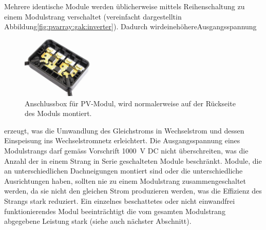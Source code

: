 Mehrere  identische  Module  werden  \"ublicherweise  mittels  Reihenschaltung
zu  einem  Modulstrang  verschaltet  (vereinfacht  dargestellt\hfill  in\hfill
Abbildung\hfill    \ref{fig:pvarray:gak:inverter}).    \hfill    Dadurch\hfill
wird\hfill eine\hfill h\"ohere\hfill Ausgangsspannung

\begin{figure}
    \centering
    \includegraphics[width=0.3\textwidth]{images/solar-facility/pvJunctionBox.jpeg}
    \caption[Anschlussbox PV-Modul]{
        Anschlussbox f\"ur  PV-Modul, wird  normalerweise auf  der R\"uckseite
        des Moduls montiert. \cite{ref:junctionBox}%
    }
    \label{fig:pvJunctionBox}
\end{figure}

\noindent erzeugt,  was die  Umwandlung des  Gleichstroms in  Wechselstrom und
dessen  Einspeisung  ins  Wechselstromnetz  erleichtert. Die  Ausgangsspannung
eines  Modulstrangs   darf  gem\"ass  Vorschrift  \SI{1000}{\volt}   DC  nicht
\"uberschreiten,  was die  Anzahl der  in einem  Strang in  Serie geschalteten
Module beschr\"ankt.  Module, die  an unterschiedlichen Dachneigungen montiert
sind  oder die  unterschiedliche  Ausrichtungen haben,  sollten  nie zu  einem
Modulstrang  zusammengeschaltet  werden,  da  sie  nicht  den  gleichen  Strom
produzieren  werden,  was  die  Effizienz  des  Strangs  stark  reduziert. Ein
einzelnes   beschattetes  oder   nicht   einwandfrei  funktionierendes   Modul
beeintr\"achtigt die vom gesamten Modulstrang abgegebene Leistung stark (siehe
auch n\"achster Abschnitt).


